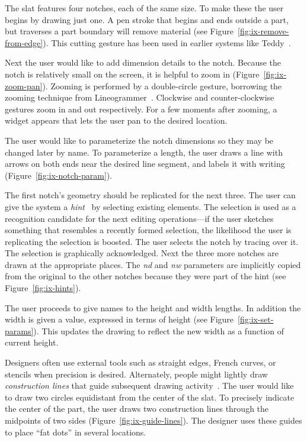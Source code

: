 \documentclass[11pt]{article}
\begin{document}
The slat features four notches, each of the same size. To make these
the user begins by drawing just one. A pen stroke that begins and ends
outside a part, but traverses a part boundary will remove material
(see Figure~\ref{fig:ix-remove-from-edge}). This cutting gesture has
been used in earlier systems like Teddy~\cite{igarashi-teddy}.

Next the user would like to add dimension details to the
notch. Because the notch is relatively small on the screen, it is
helpful to zoom in (Figure~\ref{fig:ix-zoom-pan}). Zooming is
performed by a double-circle gesture, borrowing the zooming
technique from Lineogrammer~\cite{zeleznik-lineogrammer}. Clockwise
and counter-clockwise gestures zoom in and out respectively. For a few
moments after zooming, a widget appears that lets the user pan to the
desired location.

The user would like to parameterize the notch dimensions so they may be
changed later by name. To parameterize a length, the user draws a line
with arrows on both ends near the desired line segment, and labels it
with writing (Figure~\ref{fig:ix-notch-param}).

The first notch's geometry should be replicated for the next
three. The user can give the system a
\textit{hint}~\cite{mcdaniel-gamut} by selecting existing
elements. The selection is used as a recognition candidate for the
next editing operations---if the user sketches something that
resembles a recently formed selection, the likelihood the user is
replicating the selection is boosted. The user selects the notch by
tracing over it. The selection is graphically acknowledged. Next the
three more notches are drawn at the appropriate places. The
\textit{nd} and \textit{nw} parameters are implicitly copied from the
original to the other notches because they were part of the hint (see
Figure~\ref{fig:ix-hints}).

The user proceeds to give names to the height and width lengths. In
addition the width is given a value, expressed in terms of height (see
Figure~\ref{fig:ix-set-params}). This updates the drawing to reflect
the new width as a function of current height.

Designers often use external tools such as straight edges, French
curves, or stencils when precision is desired. Alternately, people
might lightly draw \textit{construction lines} that guide subsequent
drawing activity~\cite{company-sketching-in-engineering}. The user
would like to draw two circles equidistant from the center of the
slat. To precisely indicate the center of the part, the user draws two
construction lines through the midpoints of two sides
(Figure~\ref{fig:ix-guide-lines}). The designer uses these guides
to place ``fat dots'' in several locations.
\end{document}
